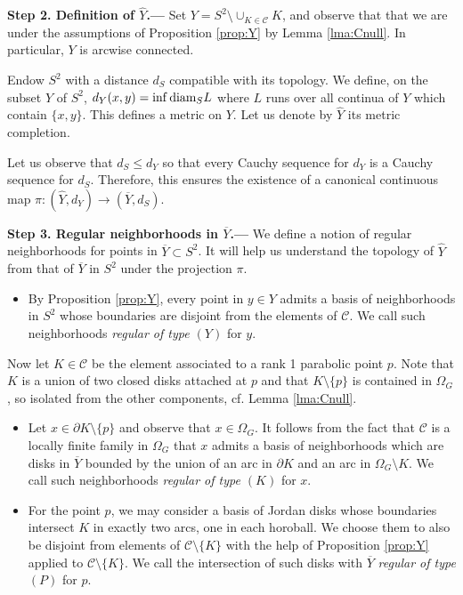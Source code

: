 \documentclass[11pt]{article}
\theoremstyle{definition}
\newcommand\CCC{\mathcal{C}}
\renewcommand\hat{\widehat}
\begin{document}
{\noindent\bf Step 2. Definition of $\widehat{Y}$.---} Set $Y=S^2\setminus \cup_{K\in\CCC} K$, and  observe that that we are under the assumptions of Proposition \ref{prop:Y} by Lemma \ref{lma:Cnull}.  In particular, $Y$ is arcwise connected. 

 Endow $S^2$ with a distance $d_S$ compatible with its topology.
  We define, on the subset  $Y$ of $S^2$,  $d_Y(x,y)=\inf \hbox{\rm diam}_S L$ where
$L$ runs over all continua of $Y$ which contain $\{x,y\}$. This defines a metric on $Y$. Let us denote
by $\hat{Y}$ its metric completion. 

\medskip 

Let us observe that $d_S\le d_Y$ so that every Cauchy sequence for $d_Y$ is a Cauchy sequence for $d_S$. Therefore, 
this ensures the existence of a canonical continuous map $\pi:(\hat{Y},d_Y)\to (\overline{Y},d_S)$. 

\medskip 


{\noindent\bf Step 3. Regular neighborhoods in $\overline{Y}$.---}
We define a notion of  regular neighborhoods for points in $\overline{Y} \subset S^2$. It will help us
understand the topology of $\hat{Y}$ from that of $\overline{Y}$ in $S^2$ under the projection $\pi$. 
\begin{itemize}
\item  By Proposition \ref{prop:Y},  every point in $y\in Y$ admits a basis of neighborhoods in $S^2$ 
whose boundaries are disjoint from the elements of $\CCC$. We call such neighborhoods {\it regular  of type $(Y)$} for $y$. 
\end{itemize}
Now let $K\in\CCC$ be the element associated to a rank 1 parabolic point $p$. Note that  $K$ is a union of two closed  disks attached at $p$
and that $K\setminus\{p\}$ is contained in $\Omega_G$, so isolated from the other components, cf. Lemma \ref{lma:Cnull}. 

\begin{itemize}

\item Let $x\in \partial K\setminus\{p\}$ and observe that $x\in \Omega_G$. It follows from the fact that $\CCC$ is a locally finite family in $\Omega_G$ that $x$ admits a basis of neighborhoods which are disks in $\overline{Y}$ bounded by the union of an arc in $\partial K$ and an arc in $\Omega_G\setminus K$.  We call such neighborhoods {\it regular of type $(K)$}  for $x$.



\item  For the point $p$,  we may consider a basis of Jordan disks whose boundaries  intersect $K$ in exactly two arcs, one in each horoball.
 We choose them to also be disjoint from elements of $\CCC\setminus\{K\}$ with the help of Proposition \ref{prop:Y} applied to $\CCC\setminus \{K\}$.
We call the intersection of such disks with $\overline{Y}$  {\it regular  of type $(P)$} for $p$.  \end{itemize}
\end{document}
